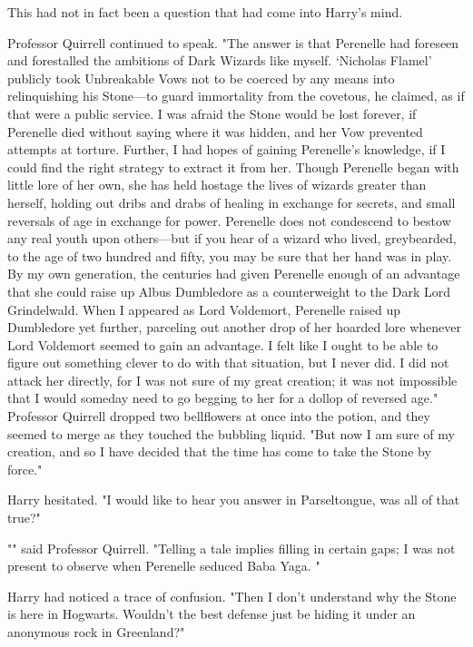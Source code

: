 This had not in fact been a question that had come into Harry's mind.

Professor Quirrell continued to speak. "The answer is that Perenelle had
foreseen and forestalled the ambitions of Dark Wizards like myself. `Nicholas
Flamel' publicly took Unbreakable Vows not to be coerced by any means into
relinquishing his Stone---to guard immortality from the covetous, he claimed,
as if that were a public service. I was afraid the Stone would be lost forever,
if Perenelle died without saying where it was hidden, and her Vow prevented
attempts at torture. Further, I had hopes of gaining Perenelle's knowledge, if
I could find the right strategy to extract it from her. Though Perenelle began
with little lore of her own, she has held hostage the lives of wizards greater
than herself, holding out dribs and drabs of healing in exchange for secrets,
and small reversals of age in exchange for power. Perenelle does not condescend
to bestow any real youth upon others---but if you hear of a wizard who lived,
greybearded, to the age of two hundred and fifty, you may be sure that her hand
was in play. By my own generation, the centuries had given Perenelle enough of
an advantage that she could raise up Albus Dumbledore as a counterweight to the
Dark Lord Grindelwald. When I appeared as Lord Voldemort, Perenelle raised up
Dumbledore yet further, parceling out another drop of her hoarded lore whenever
Lord Voldemort seemed to gain an advantage. I felt like I ought to be able to
figure out something clever to do with that situation, but I never did. I did
not attack her directly, for I was not sure of my great creation; it was not
impossible that I would someday need to go begging to her for a dollop of
reversed age." Professor Quirrell dropped two bellflowers at once into the
potion, and they seemed to merge as they touched the bubbling liquid. "But now
I am sure of my creation, and so I have decided that the time has come to take
the Stone by force."

Harry hesitated. "I would like to hear you answer in Parseltongue, was all of
that true?"

"" said Professor Quirrell.
"Telling a tale implies filling in certain gaps; I was not present to observe
when Perenelle seduced Baba Yaga. "

Harry had noticed a trace of confusion. "Then I don't understand why the
Stone is here in Hogwarts. Wouldn't the best defense just be hiding it under an
anonymous rock in Greenland?"

